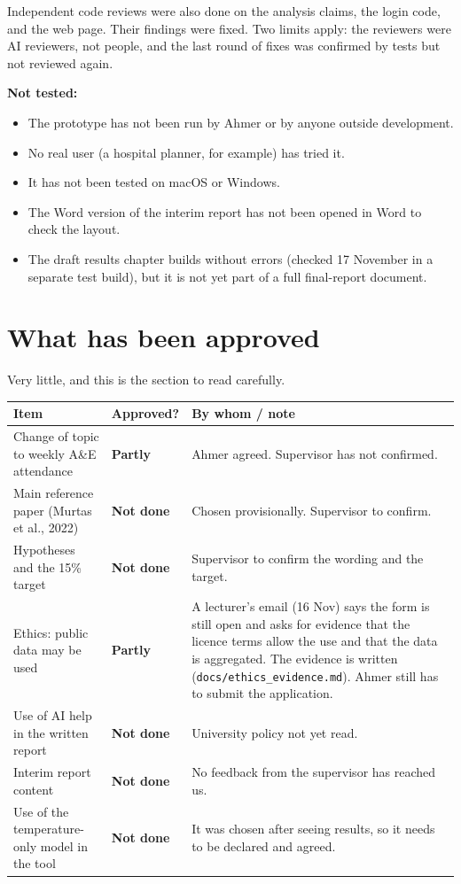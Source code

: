 \documentclass[11pt,a4paper]{article}
\newcommand{\partly}{\textcolor{warn}{\textbf{Partly}}}
\newcommand{\todo}{\textcolor{bad}{\textbf{Not done}}}
\newcommand{\file}[1]{\texttt{\small #1}}
\begin{document}
Independent code reviews were also done on the analysis claims, the login code, and the web page.
Their findings were fixed.
Two limits apply: the reviewers were AI reviewers, not people, and the last round of fixes was confirmed by tests but not reviewed again.

\textbf{Not tested:}
\begin{itemize}
\item The prototype has not been run by Ahmer or by anyone outside development.
\item No real user (a hospital planner, for example) has tried it.
\item It has not been tested on macOS or Windows.
\item The Word version of the interim report has not been opened in Word to check the layout.
\item The draft results chapter builds without errors (checked 17 November in a separate test build), but it is not yet part of a full final-report document.
\end{itemize}

\section{What has been approved}
Very little, and this is the section to read carefully.

\begin{tabularx}{\linewidth}{@{}P{6.2cm}P{2.6cm}L@{}}
\toprule
\textbf{Item} & \textbf{Approved?} & \textbf{By whom / note} \\
\midrule
Change of topic to weekly A\&E attendance & \partly{} & Ahmer agreed. Supervisor has not confirmed. \\
Main reference paper (Murtas et al., 2022) & \todo{} & Chosen provisionally. Supervisor to confirm. \\
Hypotheses and the 15\% target & \todo{} & Supervisor to confirm the wording and the target. \\
Ethics: public data may be used & \partly{} & A lecturer's email (16 Nov) says the form is still open and asks for evidence that the licence terms allow the use and that the data is aggregated. The evidence is written (\file{docs/ethics\_evidence.md}). Ahmer still has to submit the application. \\
Use of AI help in the written report & \todo{} & University policy not yet read. \\
Interim report content & \todo{} & No feedback from the supervisor has reached us. \\
Use of the temperature-only model in the tool & \todo{} & It was chosen after seeing results, so it needs to be declared and agreed. \\
\bottomrule
\end{tabularx}
\end{document}
